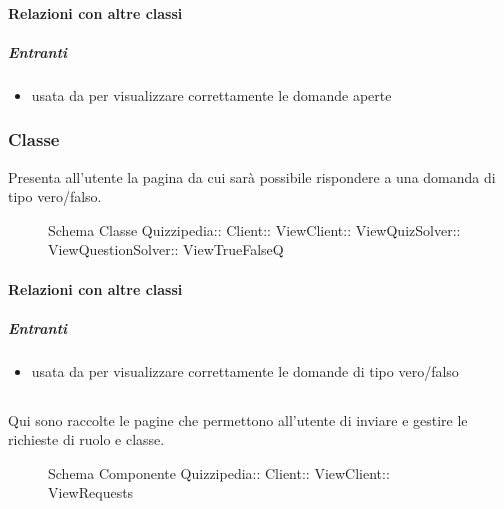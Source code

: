 \paragraph{Relazioni con altre classi}
\subparagraph{Entranti}
\begin{itemize}
\item usata da  per visualizzare correttamente le domande aperte
\end{itemize}
\subsubsection{Classe }
Presenta all'utente la pagina da cui sarà possibile rispondere a una domanda di tipo vero/falso.
\begin{figure}[H]
\centering
\noindent{}
\caption[Schema Classe ViewTrueFalseQ]{Schema Classe Quizzipedia:: Client:: ViewClient:: ViewQuizSolver:: ViewQuestionSolver:: ViewTrueFalseQ}
\end{figure}
\paragraph{Relazioni con altre classi}
\subparagraph{Entranti}
\begin{itemize}
\item usata da  per visualizzare correttamente le domande di tipo vero/falso
\end{itemize}
\subsection{}
Qui sono raccolte le pagine che permettono all'utente di inviare e gestire le richieste di ruolo e classe.
\begin{figure}[H]
\centering
\noindent{}
\caption[Schema Componente ViewRequests]{Schema Componente Quizzipedia:: Client:: ViewClient:: ViewRequests}
\end{figure}
